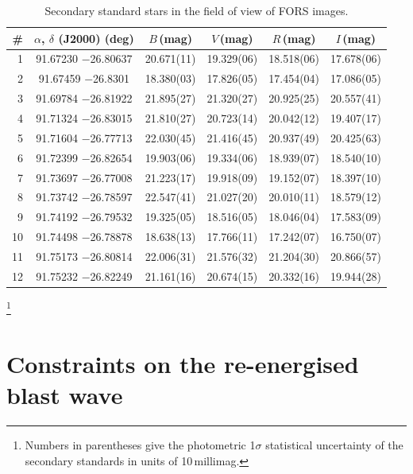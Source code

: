\documentclass[fleqn,usenatbib]{mnras}
\begin{document}
\appendix
\begin{table}[htb]
\begin{minipage}[t]{\textwidth}
\renewcommand{\footnoterule}{}
\centering
\caption{Secondary standard stars in the field of view of FORS images.}
\begin{tabular}{r|c|cccc}
\hline
\# & $\alpha$, $\delta$ (J2000) (deg) &  $B$\,(mag)  &  $V$\,(mag)  &  $R$\,(mag) &  $I$\,(mag)  \\
\hline
1  & 91.67230 $-$26.80637 & 20.671(11) & 19.329(06) &  18.518(06) & 17.678(06)  \\ 
2  & 91.67459 $-$26.8301  & 18.380(03) & 17.826(05) &  17.454(04) & 17.086(05)  \\ 
3  & 91.69784 $-$26.81922 & 21.895(27) & 21.320(27) &  20.925(25) & 20.557(41)  \\ 
4  & 91.71324 $-$26.83015 & 21.810(27) & 20.723(14)  &  20.042(12) & 19.407(17) \\ 
5  & 91.71604 $-$26.77713 & 22.030(45) & 21.416(45)  &20.937(49)& 20.425(63)    \\ 
6  & 91.72399 $-$26.82654 & 19.903(06) & 19.334(06) & 18.939(07) & 18.540(10)  \\ 
7  & 91.73697 $-$26.77008 & 21.223(17) & 19.918(09) &  19.152(07) & 18.397(10)  \\ 
8  & 91.73742 $-$26.78597 & 22.547(41) & 21.027(20)  &  20.010(11)& 18.579(12)  \\ 
9  & 91.74192 $-$26.79532 & 19.325(05) & 18.516(05)  &  18.046(04)& 17.583(09)  \\ 
10 & 91.74498 $-$26.78878 & 18.638(13) & 17.766(11)  &  17.242(07)& 16.750(07)  \\ 
11 & 91.75173 $-$26.80814 & 22.006(31) & 21.576(32)  &  21.204(30)& 20.866(57)  \\
12 & 91.75232 $-$26.82249 & 21.161(16) & 20.674(15)  &  20.332(16)& 19.944(28)  \\ 
\hline
\end{tabular}
\footnote{Numbers in parentheses give the photometric 1$\sigma$ statistical uncertainty of the secondary standards in units of 10\,millimag.}
\label{table:std}
\end{minipage}
\end{table}



\section{Constraints on the re-energised blast wave}
\end{document}
